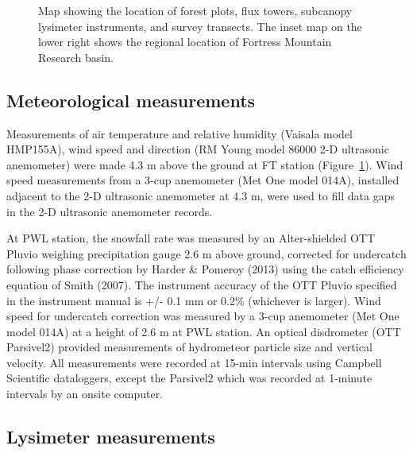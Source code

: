 \documentclass[
  letterpaper,
  DIV=11,
  numbers=noendperiod]{scrartcl}
\begin{document}
\begin{figure}[H]


\caption{\label{fig-site-map}Map showing the location of forest plots,
flux towers, subcanopy lysimeter instruments, and survey transects. The
inset map on the lower right shows the regional location of Fortress
Mountain Research basin.}

\end{figure}%

\subsection{Meteorological
measurements}\label{meteorological-measurements}

Measurements of air temperature and relative humidity (Vaisala model
HMP155A), wind speed and direction (RM Young model 86000 2-D ultrasonic
anemometer) were made 4.3 m above the ground at FT station
(Figure~\ref{fig-site-map}). Wind speed measurements from a 3-cup
anemometer (Met One model 014A), installed adjacent to the 2-D
ultrasonic anemometer at 4.3 m, were used to fill data gaps in the 2-D
ultrasonic anemometer records.

At PWL station, the snowfall rate was measured by an Alter-shielded OTT
Pluvio weighing precipitation gauge 2.6 m above ground, corrected for
undercatch following phase correction by Harder \& Pomeroy (2013) using
the catch efficiency equation of Smith (2007). The instrument accuracy
of the OTT Pluvio specified in the instrument manual is +/- 0.1 mm or
0.2\% (whichever is larger). Wind speed for undercatch correction was
measured by a 3-cup anemometer (Met One model 014A) at a height of 2.6 m
at PWL station. An optical disdrometer (OTT Parsivel2) provided
measurements of hydrometeor particle size and vertical velocity. All
measurements were recorded at 15-min intervals using Campbell Scientific
dataloggers, except the Parsivel2 which was recorded at 1-minute
intervals by an onsite computer.

\subsection{Lysimeter measurements}\label{lysimeter-measurements}
\end{document}
